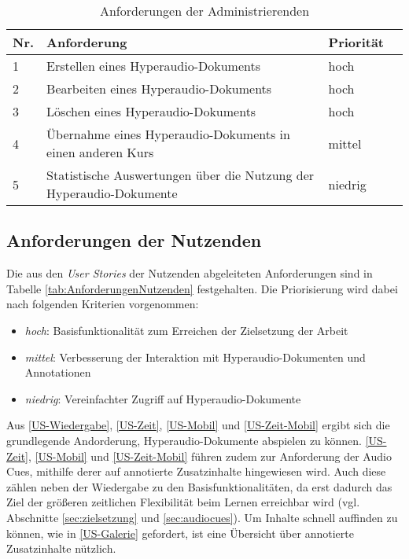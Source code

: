 \begin{table}[!ht]
\def\arraystretch{1.4}
\caption{Anforderungen der Administrierenden}
\label{tab:AnforderungenAdministrierenden}
 \begin{tabularx}{\textwidth}{lXll}      
    \hline
    Nr. & Anforderung & Priorität
    \\\hline
    1 & Erstellen eines Hyperaudio-Dokuments & hoch\\
    2 & Bearbeiten eines Hyperaudio-Dokuments & hoch\\
    3 & Löschen eines Hyperaudio-Dokuments & hoch\\
    4 & Übernahme eines Hyperaudio-Dokuments in einen anderen Kurs & mittel\\
    5 & Statistische Auswertungen über die Nutzung der Hyperaudio-Dokumente & niedrig\\
    \hline
    \end{tabularx}
\end{table}


\subsection{Anforderungen der Nutzenden}
Die aus den \textit{User Stories} der Nutzenden abgeleiteten Anforderungen sind in Tabelle \ref{tab:AnforderungenNutzenden} festgehalten. Die Priorisierung wird dabei nach folgenden Kriterien vorgenommen:

\begin{itemize}
\item \textit{hoch}: Basisfunktionalität zum Erreichen der Zielsetzung der Arbeit
\item \textit{mittel}: Verbesserung der Interaktion mit Hyperaudio-Dokumenten und Annotationen
\item \textit{niedrig}: Vereinfachter Zugriff auf Hyperaudio-Dokumente
\end{itemize}


Aus \ref{US-Wiedergabe}, \ref{US-Zeit}, \ref{US-Mobil} und \ref{US-Zeit-Mobil} ergibt sich die grundlegende Andorderung, Hyperaudio-Dokumente abspielen zu können. \ref{US-Zeit}, \ref{US-Mobil} und \ref{US-Zeit-Mobil} führen zudem zur Anforderung der Audio Cues, mithilfe derer auf annotierte Zusatzinhalte hingewiesen wird. Auch diese zählen neben der Wiedergabe zu den Basisfunktionalitäten, da erst dadurch das Ziel der größeren zeitlichen Flexibilität beim Lernen erreichbar wird (vgl. Abschnitte \ref{sec:zielsetzung} und \ref{sec:audiocues}). Um Inhalte schnell auffinden zu können, wie in \ref{US-Galerie} gefordert, ist eine Übersicht über annotierte Zusatzinhalte nützlich.

